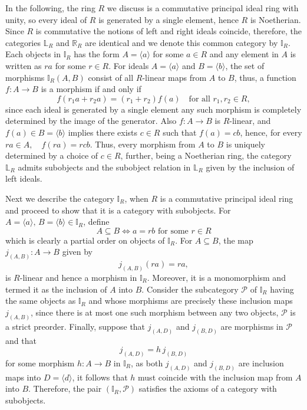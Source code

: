 \documentclass[12pt,a4paper]{amsart}
\theoremstyle{plain}
\theoremstyle{definition}
\begin{document}
In the following, the ring $R$  we discuss is a commutative principal ideal ring with unity, 
so every ideal of $R$ is generated by a single element, hence $R$ is Noetherian. Since $R$ is commutative the notions of left and right ideals coincide, therefore, the categories $\mathbb{L}_R$ and $\mathbb{R}_R$ are identical and we denote this common category by
$\mathbb{I}_R$.  
Each objects in $\mathbb{I}_R$ has the form $A = \langle a \rangle$ for some $a \in R$ and any element in $A$ is written as $ra$ for some $r \in R$. For ideals $A = \langle a \rangle$ and $B = \langle b \rangle$, the set of morphisms $\mathbb{I}_R(A,B)$ consist of all $R$-linear maps from $A$ to $B$, thus, a function $f : A \to B$ is a morphism if and only if
\[
f(r_1 a + r_2 a) = (r_1 + r_2) f(a)
\quad \text{for all } r_1, r_2 \in R,
\]
since each ideal is generated by a single element any such morphism is completely determined by the image of the generator.  
Also $f : A \to B$ is $R$-linear, and $f(a) \in B = \langle b \rangle$ implies there exists $c \in R$ such that $f(a) = cb$, hence, for every $ra \in A,\quad f(ra) = rcb.$
Thus, every morphism from $A$ to $B$ is uniquely determined by a choice of $c \in R$, 
further, being a Noetherian ring, the category $\mathbb{L}_R$ admits subobjects and the subobject relation in $\mathbb{L}_R$ given by the inclusion of left ideals. 

Next we describe the category $\mathbb{I}_R$,  when $R$ is a commutative principal ideal ring and proceed to show that it is a category with subobjects. For $A = \langle a \rangle,\, B = \langle b \rangle \in \mathbb{I}_R$,  define
\[
A \subseteq B \iff a = rb \text{ for some } r \in R
\]
which is clearly a partial order on objects of $\mathbb{I}_R$.
For $A \subseteq B$, the map $j_{(A,B)} : A \to B$ given by  
\[
j_{(A,B)}(ra) = ra, 
\] 
is $R$-linear and hence a morphism in $\mathbb{I}_R$. Moreover, it is a monomorphism and termed it as the inclusion of $A$ into $B$.
Consider the subcategory $\mathcal{P}$ of $\mathbb{I}_R$ having the same objects as $\mathbb{I}_R$ and whose morphisms are precisely these inclusion maps $j_{(A,B)}$, since there is at most one such morphism between any two objects, $\mathcal{P}$ is a strict preorder.
Finally, suppose that $j_{(A,D)}$ and $j_{(B,D)}$ are morphisms in $\mathcal{P}$ and that
\[
j_{(A,D)} = h \, j_{(B,D)}
\]
for some morphism $h : A \to B$ in $\mathbb{I}_R$, as both $j_{(A,D)}$ and $j_{(B,D)}$ are inclusion maps into $D = \langle d \rangle$, it follows that $h$ must coincide with the inclusion map from $A$ into $B$. 
Therefore, the pair $(\mathbb{I}_R, \mathcal{P})$ satisfies the axioms of a category with subobjects.
\end{document}
